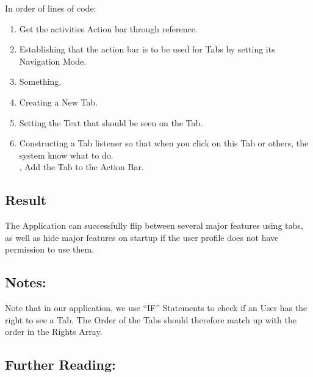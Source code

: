 \noindent In order of lines of code:\\
\begin{enumerate}
\item Get the activities Action bar through reference.
\item Establishing that the action bar is to be used for Tabs by setting its Navigation Mode.\\
\item Something.
\item Creating a New Tab.
\item Setting the Text that should be seen on the Tab.
\item Constructing a Tab listener so that when you click on this Tab or others, the system know what to do.\\
\itemFinally, Add the Tab to the Action Bar.
\end{enumerate}

\subsection*{Result}
The Application can successfully flip between several major features using tabs, as well as hide major features on startup if the user profile does not have permission to use them.

\subsection*{Notes:}
Note that in our application, we use ``IF'' Statements to check if an User has the right to see a Tab.
The Order of the Tabs should therefore match up with the order in the Rights Array.

\subsection*{Further Reading:}

